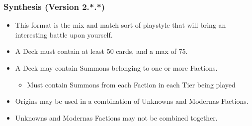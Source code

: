 \subsubsection{Synthesis (Version 2.*.*)}
\begin{itemize}
    \item This format is the mix and match sort of playstyle that will bring an interesting battle upon yourself. 
    \item A Deck must contain at least 50 cards, and a max of 75. 
    \item A Deck may contain Summons belonging to one or more Factions. 
        \begin{itemize}
            \item Must contain Summons from each Faction in each Tier being played
        \end{itemize}
    \item Origins may be used in a combination of Unknowns and Modernas Factions. 
    \item Unknowns and Modernas Factions may not be combined together. 
\end{itemize}